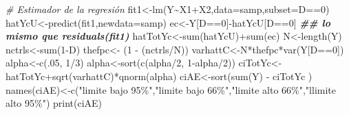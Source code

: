 \documentclass[
]{article}
\newenvironment{Shaded}{\begin{snugshade}}{\end{snugshade}}
\newcommand{\AttributeTok}[1]{\textcolor[rgb]{0.77,0.63,0.00}{#1}}
\newcommand{\CommentTok}[1]{\textcolor[rgb]{0.56,0.35,0.01}{\textit{#1}}}
\newcommand{\DecValTok}[1]{\textcolor[rgb]{0.00,0.00,0.81}{#1}}
\newcommand{\DocumentationTok}[1]{\textcolor[rgb]{0.56,0.35,0.01}{\textbf{\textit{#1}}}}
\newcommand{\FunctionTok}[1]{\textcolor[rgb]{0.00,0.00,0.00}{#1}}
\newcommand{\NormalTok}[1]{#1}
\newcommand{\OtherTok}[1]{\textcolor[rgb]{0.56,0.35,0.01}{#1}}
\newcommand{\SpecialCharTok}[1]{\textcolor[rgb]{0.00,0.00,0.00}{#1}}
\newcommand{\StringTok}[1]{\textcolor[rgb]{0.31,0.60,0.02}{#1}}
\begin{document}
\begin{Shaded}
\begin{Highlighting}[]
\CommentTok{\# Estimador de la regresión}
\NormalTok{fit1}\OtherTok{\textless{}{-}}\FunctionTok{lm}\NormalTok{(Y}\SpecialCharTok{\textasciitilde{}}\NormalTok{X1}\SpecialCharTok{+}\NormalTok{X2,}\AttributeTok{data=}\NormalTok{samp,}\AttributeTok{subset=}\NormalTok{D}\SpecialCharTok{==}\DecValTok{0}\NormalTok{) }
\NormalTok{hatYcU}\OtherTok{\textless{}{-}}\FunctionTok{predict}\NormalTok{(fit1,}\AttributeTok{newdata=}\NormalTok{samp) }
\NormalTok{ec}\OtherTok{\textless{}{-}}\NormalTok{Y[D}\SpecialCharTok{==}\DecValTok{0}\NormalTok{]}\SpecialCharTok{{-}}\NormalTok{hatYcU[D}\SpecialCharTok{==}\DecValTok{0}\NormalTok{] }\DocumentationTok{\#\# lo mismo que residuals(fit1) }
\NormalTok{hatTotYc}\OtherTok{\textless{}{-}}\FunctionTok{sum}\NormalTok{(hatYcU)}\SpecialCharTok{+}\FunctionTok{sum}\NormalTok{(ec) }
\NormalTok{N}\OtherTok{\textless{}{-}}\FunctionTok{length}\NormalTok{(Y) }
\NormalTok{nctrls}\OtherTok{\textless{}{-}}\FunctionTok{sum}\NormalTok{(}\DecValTok{1}\SpecialCharTok{{-}}\NormalTok{D) }
\NormalTok{thefpc}\OtherTok{\textless{}{-}}\NormalTok{ (}\DecValTok{1} \SpecialCharTok{{-}}\NormalTok{ (nctrls}\SpecialCharTok{/}\NormalTok{N)) }
\NormalTok{varhattC}\OtherTok{\textless{}{-}}\NormalTok{N}\SpecialCharTok{*}\NormalTok{thefpc}\SpecialCharTok{*}\FunctionTok{var}\NormalTok{(Y[D}\SpecialCharTok{==}\DecValTok{0}\NormalTok{]) }
\NormalTok{alpha}\OtherTok{\textless{}{-}}\FunctionTok{c}\NormalTok{(.}\DecValTok{05}\NormalTok{, }\DecValTok{1}\SpecialCharTok{/}\DecValTok{3}\NormalTok{) }
\NormalTok{alpha}\OtherTok{\textless{}{-}}\FunctionTok{sort}\NormalTok{(}\FunctionTok{c}\NormalTok{(alpha}\SpecialCharTok{/}\DecValTok{2}\NormalTok{, }\DecValTok{1}\SpecialCharTok{{-}}\NormalTok{alpha}\SpecialCharTok{/}\DecValTok{2}\NormalTok{)) }
\NormalTok{ciTotYc}\OtherTok{\textless{}{-}}\NormalTok{hatTotYc}\SpecialCharTok{+}\FunctionTok{sqrt}\NormalTok{(varhattC)}\SpecialCharTok{*}\FunctionTok{qnorm}\NormalTok{(alpha) }
\NormalTok{ciAE}\OtherTok{\textless{}{-}}\FunctionTok{sort}\NormalTok{(}\FunctionTok{sum}\NormalTok{(Y) }\SpecialCharTok{{-}}\NormalTok{ ciTotYc ) }
\FunctionTok{names}\NormalTok{(ciAE)}\OtherTok{\textless{}{-}}\FunctionTok{c}\NormalTok{(}\StringTok{"limite bajo 95\%"}\NormalTok{,}\StringTok{"limite bajo }
\StringTok{66\%"}\NormalTok{,}\StringTok{"limite alto 66\%"}\NormalTok{,}\StringTok{"llimite alto 95\%"}\NormalTok{) }
\FunctionTok{print}\NormalTok{(ciAE) }
\end{Highlighting}
\end{Shaded}
\end{document}
